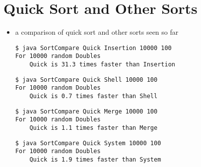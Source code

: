 \documentclass[8pt,a4paper,compress]{beamer}
\begin{document}
\section{Quick Sort and Other Sorts}
\begin{frame}[fragile]
\begin{itemize}
\item a comparison of quick sort and other sorts seen so far
\begin{lstlisting}[language={}]
$ java SortCompare Quick Insertion 10000 100
For 10000 random Doubles
    Quick is 31.3 times faster than Insertion
\end{lstlisting}

\begin{lstlisting}[language={}]
$ java SortCompare Quick Shell 10000 100
For 10000 random Doubles
    Quick is 0.7 times faster than Shell
\end{lstlisting}

\begin{lstlisting}[language={}]
$ java SortCompare Quick Merge 10000 100
For 10000 random Doubles
    Quick is 1.1 times faster than Merge
\end{lstlisting}

\begin{lstlisting}[language={}]
$ java SortCompare Quick System 10000 100
For 10000 random Doubles
    Quick is 1.9 times faster than System
\end{lstlisting}
\end{itemize}
\end{frame}
\end{document}
